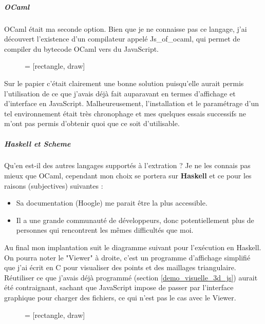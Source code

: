 \documentclass[]{article}
\begin{document}
\subparagraph{OCaml}\label{OCaml_to_js}
OCaml était ma seconde option. Bien que je ne connaisse pas ce langage, j'ai découvert l'existence d'un compilateur appelé Js\_of\_ocaml, qui permet de compiler du bytecode OCaml vers du JavaScript.
\begin{figure}[H]
	\begin{center}
		 = [rectangle, draw]
	\end{center}
\end{figure}
Sur le papier c'était clairement une bonne solution puisqu'elle aurait permis l'utilisation de ce que j'avais déjà fait auparavant en termes d'affichage et d'interface en JavaScript. Malheureusement, l'installation et le paramétrage d'un tel environnement était très chronophage et mes quelques essais successifs ne m'ont pas permis d'obtenir quoi que ce soit d'utilisable.

\subparagraph*{Haskell et Scheme}
Qu'en est-il des autres langages supportés à l'extration ? Je ne les connais pas mieux que OCaml, cependant mon choix se portera sur \textbf{Haskell} et ce pour les raisons (subjectives) suivantes :
\begin{itemize}
	\item Sa documentation (Hoogle) me parait être la plus accessible.
	\item Il a une grande communauté de développeurs, donc potentiellement plus de personnes qui rencontrent les mêmes difficultés que moi.
\end{itemize}
Au final mon implantation suit le diagramme suivant pour l'exécution en Haskell. On pourra noter le "Viewer" à droite, c'est un programme d'affichage simplifié que j'ai écrit en C pour visualiser des points et des maillages triangulaire. Réutiliser ce que j'avais déjà programmé (section \ref{demo_visuelle_3d_js}) aurait été contraignant, sachant que JavaScript impose de passer par l'interface graphique pour charger des fichiers, ce qui n'est pas le cas avec le Viewer.
\begin{figure}[H]
	\begin{center}
		 = [rectangle, draw]
	\end{center}
\end{figure}
\end{document}
